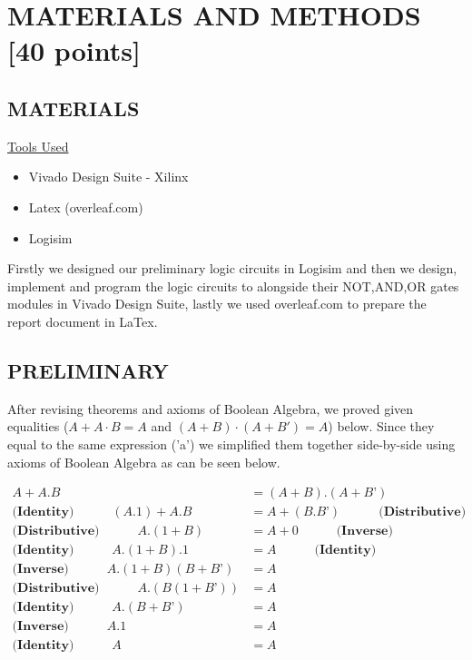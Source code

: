 \documentclass[pdftex,12pt,a4paper]{article}
\begin{document}
\section{MATERIALS AND METHODS [40 points]}

\subsection{MATERIALS}
\underline{Tools Used}
\begin{itemize}
    \item {Vivado Design Suite - Xilinx}
    \item{Latex (overleaf.com)}
    \item{Logisim}
\end{itemize}
Firstly we designed our preliminary logic circuits in Logisim and then we design, implement and program the logic circuits to alongside their NOT,AND,OR gates modules in Vivado Design Suite, lastly we used overleaf.com to prepare the report document in LaTex.



\subsection{PRELIMINARY}
After revising theorems and axioms of Boolean Algebra, we proved given equalities (\(A + A · B = A\) and \((A + B) · (A + B') = A\))  below. Since they equal to the same expression ('a') we simplified them together side-by-side using axioms of Boolean Algebra as can be seen below. 

\begin{align*}
A + A.B	&= (A + B).(A + B’)  \\
\textbf{(Identity)} \qquad\quad (A.1) + A.B &= A + (B.B’) \qquad\quad \textbf{(Distributive)}\\
\textbf{(Distributive)}\qquad\quad A.(1 + B) &= A + 0 \qquad\quad \textbf{(Inverse)}\\
\textbf{(Identity)} \qquad\quad A.(1 + B).1 &= A \qquad\quad \textbf{(Identity)}\\
\textbf{(Inverse)} \qquad\quad A.(1 + B)(B + B’) &= A \\
\textbf{(Distributive)} \qquad\quad A.(B(1 + B’)) &= A \\
\textbf{(Identity)} \qquad\quad A.(B + B’) &= A \\
\textbf{(Inverse)} \qquad\quad A.1 &=  A \\
\textbf{(Identity)} \qquad\quad A &=  A\\
\end{align*}
\end{document}
